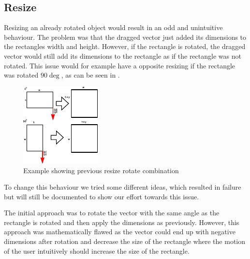 \subsection{Resize}
Resizing an already rotated object would result in an odd and unintuitive behaviour.
The problem was that the dragged vector just added its dimensions to the rectangles width and height.
However, if the rectangle is rotated, the dragged vector would still add its dimensions to the rectangle as if the rectangle was not rotated.
This issue would for example have a opposite resizing if the rectangle was rotated $90\deg$, as can be seen in .
\begin{figure}
\includegraphics[scale=0.5]{media/sprint3/How-Rotate+Resize-Worked}
\caption{Example showing previous resize rotate combination}
\label{fig:resizeRotate}
\end{figure}
To change this behaviour we tried some different ideas, which resulted in failure but will still be documented to show our effort towards this issue. 

The initial approach was to rotate the vector with the same angle as the rectangle is rotated and then apply the dimensions as previously.
However, this approach was mathematically flawed as the vector could end up with negative dimensions after rotation and decrease the size of the rectangle where the motion of the user intuitively should increase the size of the rectangle.

